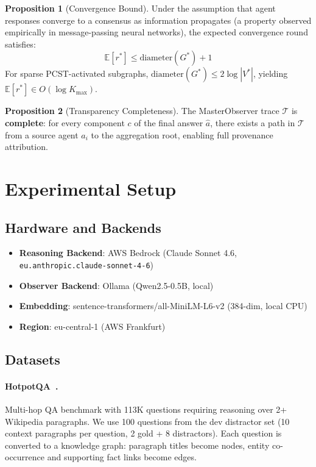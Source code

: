\documentclass[a4paper,11pt]{article}
\theoremstyle{definition}
\newtheorem{proposition}{Proposition}[section]
\begin{document}
\begin{proposition}[Convergence Bound]
\label{prop:convergence}
Under the assumption that agent responses converge to a consensus as information propagates (a property observed empirically in message-passing neural networks), the expected convergence round satisfies:
\[
\mathbb{E}[r^*] \leq \mathrm{diameter}(G^*) + 1
\]
For sparse PCST-activated subgraphs, $\mathrm{diameter}(G^*) \leq 2\log|V^*|$, yielding $\mathbb{E}[r^*] \in O(\log K_{\max})$.
\end{proposition}

\begin{proposition}[Transparency Completeness]
The MasterObserver trace $\mathcal{T}$ is \textbf{complete}: for every component $c$ of the final answer $\hat{a}$, there exists a path in $\mathcal{T}$ from a source agent $a_i$ to the aggregation root, enabling full provenance attribution.
\end{proposition}

\section{Experimental Setup}
\label{sec:experiments}

\subsection{Hardware and Backends}

\begin{itemize}
\item \textbf{Reasoning Backend}: AWS Bedrock (Claude Sonnet 4.6, \texttt{eu.anthropic.claude-sonnet-4-6})
\item \textbf{Observer Backend}: Ollama (Qwen2.5-0.5B, local)
\item \textbf{Embedding}: sentence-transformers/all-MiniLM-L6-v2 (384-dim, local CPU)
\item \textbf{Region}: eu-central-1 (AWS Frankfurt)
\end{itemize}

\subsection{Datasets}

\paragraph{HotpotQA~\cite{hotpotqa2018}.}
Multi-hop QA benchmark with 113K questions requiring reasoning over 2+ Wikipedia paragraphs.
We use 100 questions from the dev distractor set (10 context paragraphs per question, 2 gold + 8 distractors).
Each question is converted to a knowledge graph: paragraph titles become nodes, entity co-occurrence and supporting fact links become edges.
\end{document}
